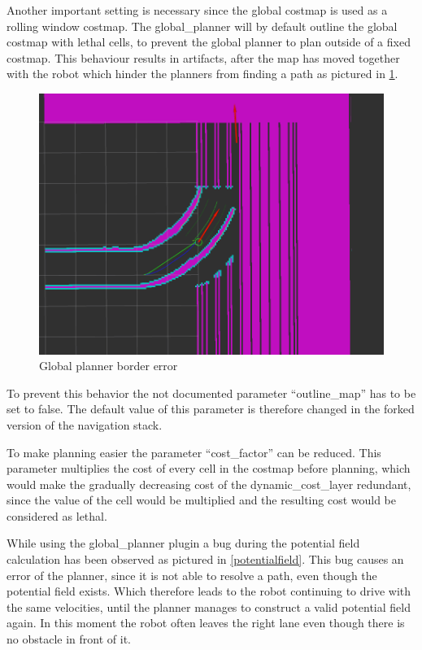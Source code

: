 Another important setting is necessary since the global costmap is used as a rolling window costmap. The global\_planner will by default outline the global costmap with lethal cells, to prevent the global planner to plan outside of a fixed costmap. This behaviour results in artifacts, after the map has moved together with the robot which hinder the planners from finding a path as pictured in \ref{boardererror}.

\begin{figure} [H]
	\centering
	\includegraphics[width=\textwidth]{Pictures/borders}
	
	\caption{Global planner border error}
	\label{boardererror}
\end{figure}

To prevent this behavior the not documented parameter ``outline\_map'' has to be set to false. The default value of this parameter is therefore changed in the forked version of the navigation stack.

To make planning easier the parameter ``cost\_factor'' can be reduced. This parameter multiplies the cost of every cell in the costmap before planning, which
 would make the gradually decreasing cost of the dynamic\_cost\_layer redundant, since the value of the cell would be multiplied and the resulting cost would be considered as lethal.
 
 
 While using the global\_planner plugin a bug during the potential field calculation has been observed as pictured in \ref{potentialfield}. This bug causes an error of the planner, since it is not able to resolve a path, even though the potential field exists. Which therefore leads to the robot continuing to drive with the same velocities,  until the planner manages to construct a valid potential field again. In this moment the robot often leaves the right lane even though there is no obstacle in front of it.\\
 

